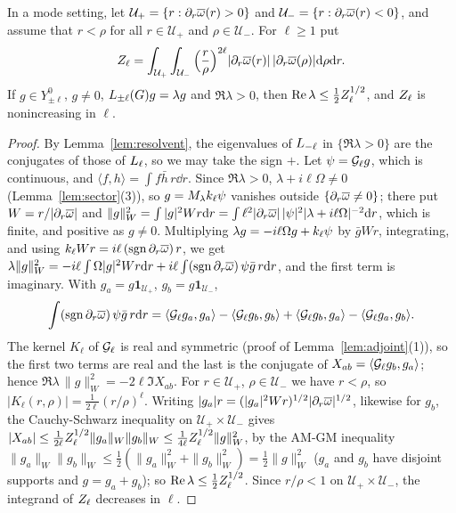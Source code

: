 \begin{lemma}
\label{lem:edge}
In a mode setting, let $\mathcal U_+=\{r:\partial_r\overline{\omega}(r)>0\}$ and
$\mathcal U_-=\{r:\partial_r\overline{\omega}(r)<0\}$, and assume that $r<\rho$ for all
$r\in\mathcal U_+$ and $\rho\in\mathcal U_-$. For $\ell\ge1$ put
\[
Z_\ell=\int_{\mathcal U_+}\int_{\mathcal U_-}\Big(\frac r\rho\Big)^{2\ell}|\partial_r\overline{\omega}(r)|\,|\partial_r\overline{\omega}(\rho)|\dd\rho\dd r .
\]
If $g\in Y^0_{\pm\ell}$, $g\ne0$, $L_{\pm\ell}(G)g=\lambda g$ and
$\Re\lambda>0$, then $\Re\lambda\le\frac12Z_\ell^{1/2}$, and $Z_\ell$ is
nonincreasing in $\ell$.
\end{lemma}
\begin{proof}
By Lemma~\ref{lem:resolvent}, the eigenvalues of $L_{-\ell}$ in
$\{\Re\lambda>0\}$ are the conjugates of those of $L_{\ell}$, so we may take the
sign $+$. Let $\psi=\mathcal{G}_\ell g$, which is continuous, and
$\langle f,h\rangle=\int f\bar h\,r\dd r$. Since $\Re\lambda>0$, $\lambda+i\ell\Omega\ne0$
(Lemma~\ref{lem:sector}(3)), so $g=M_\lambda k_\ell\psi$ vanishes outside
$\{\partial_r\overline{\omega}\ne0\}$; there put $W=r/|\partial_r\overline{\omega}|$ and
$\|g\|_W^2=\int|g|^2Wr\dd r=\int\ell^2|\partial_r\overline{\omega}|\,|\psi|^2|\lambda+i\ell\Omega|^{-2}\dd r$,
which is finite, and positive as $g\ne0$. Multiplying $\lambda g=-i\ell\Omega g+k_\ell\psi$
by $\bar gWr$, integrating, and using $k_\ell Wr=i\ell\,(\operatorname{sgn}\partial_r\overline{\omega})\,r$, we get
$\lambda\|g\|_W^2=-i\ell\int\Omega|g|^2Wr\dd r+i\ell\int(\operatorname{sgn}\partial_r\overline{\omega})\,\psi\bar g\,r\dd r$,
and the first term is imaginary. With $g_a=g\mathbf 1_{\mathcal U_+}$,
$g_b=g\mathbf 1_{\mathcal U_-}$,
\[
\int(\operatorname{sgn}\partial_r\overline{\omega})\,\psi\bar g\,r\dd r=\langle\mathcal{G}_\ell g_a,g_a\rangle-\langle\mathcal{G}_\ell g_b,g_b\rangle
+\langle\mathcal{G}_\ell g_b,g_a\rangle-\langle\mathcal{G}_\ell g_a,g_b\rangle .
\]
The kernel $K_\ell$ of $\mathcal{G}_\ell$ is real and symmetric (proof of
Lemma~\ref{lem:adjoint}(1)), so the first two terms are real
and the last is the conjugate of $X_{ab}=\langle\mathcal{G}_\ell g_b,g_a\rangle$; hence
$\Re\lambda\,\|g\|_W^2=-2\ell\Im X_{ab}$. For $r\in\mathcal U_+$, $\rho\in\mathcal U_-$
we have $r<\rho$, so $|K_\ell(r,\rho)|=\frac1{2\ell}(r/\rho)^\ell$. Writing
$|g_a|r=(|g_a|^2Wr)^{1/2}|\partial_r\overline{\omega}|^{1/2}$, likewise for $g_b$, the Cauchy-Schwarz
inequality on $\mathcal U_+\times\mathcal U_-$ gives
$|X_{ab}|\le\frac1{2\ell}Z_\ell^{1/2}\|g_a\|_W\|g_b\|_W\le\frac1{4\ell}Z_\ell^{1/2}\|g\|_W^2$,
by the AM-GM inequality $\|g_a\|_W\|g_b\|_W\le\frac12(\|g_a\|_W^2+\|g_b\|_W^2)=\frac12\|g\|_W^2$
($g_a$ and $g_b$ have disjoint supports and $g=g_a+g_b$); so
$\Re\lambda\le\frac12Z_\ell^{1/2}$. Since $r/\rho<1$ on $\mathcal U_+\times\mathcal U_-$, the
integrand of $Z_\ell$ decreases in $\ell$.
\end{proof}

